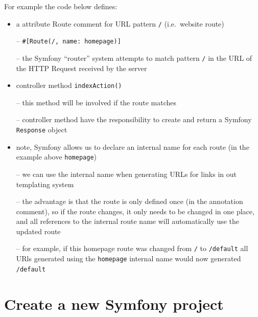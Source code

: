 \documentclass[a4paperpaper,openright]{book}
\begin{document}
For example the code below defines:

\begin{itemize}
\item
  a attribute Route comment for URL pattern \texttt{/} (i.e.~website
  route)

  --
  \texttt{\#{[}Route(\textquotesingle{}/\textquotesingle{},\ name:\ \textquotesingle{}homepage\textquotesingle{}){]}}

  -- the Symfony ``router'' system attempts to match pattern \texttt{/}
  in the URL of the HTTP Request received by the server
\item
  controller method \texttt{indexAction()}

  -- this method will be involved if the route matches

  -- controller method have the responsibility to create and return a
  Symfony \texttt{Response} object
\item
  note, Symfony allows us to declare an internal name for each route (in
  the example above \texttt{homepage})

  -- we can use the internal name when generating URLs for links in out
  templating system

  -- the advantage is that the route is only defined once (in the
  annotation comment), so if the route changes, it only needs to be
  changed in one place, and all references to the internal route name
  will automatically use the updated route

  -- for example, if this homepage route was changed from \texttt{/} to
  \texttt{/default} all URls generated using the \texttt{homepage}
  internal name would now generated \texttt{/default}
\end{itemize}

\hypertarget{create-a-new-symfony-project}{%
\section{Create a new Symfony
project}\label{create-a-new-symfony-project}}
\end{document}
